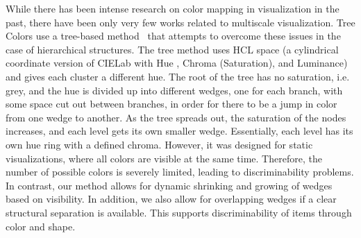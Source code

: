 \documentclass{egpubl}
\begin{document}
	While there has been intense research on color mapping in visualization in the past, there have been only very few works related to multiscale visualization.
	Tree Colors use a tree-based method~\cite{tennekes2014tree} that attempts to overcome these issues in the case of hierarchical structures. 
	The tree method uses HCL space (a cylindrical coordinate version of CIELab with Hue , Chroma (Saturation), and Luminance) and gives each cluster a different hue. 
	The root of the tree has no saturation, i.e. grey, and the hue is divided up into different wedges, one for each branch, with some space cut out between branches, in order for there to be a jump in color from one wedge to another. 
	As the tree spreads out, the saturation of the nodes increases, and each level gets its own smaller wedge. 
	Essentially, each level has its own hue ring with a defined chroma. 
	However, it was designed for static visualizations, where all colors are visible at the same time. Therefore, the number of possible colors is severely limited, leading to discriminability problems.
	In contrast, our method allows for dynamic shrinking and growing of wedges based on visibility. 
	In addition, we also allow for overlapping wedges if a clear structural separation is available. 
	This supports discriminability of items through color and shape. 
	
	
	
\end{document}
